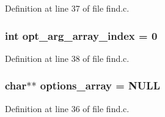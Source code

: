 Definition at line 37 of file find.c.

\subsubsection[{opt\_\-arg\_\-array\_\-index}]{\setlength{\rightskip}{0pt plus 5cm}int {\bf opt\_\-arg\_\-array\_\-index} = 0}\label{find_8c_a29ff3aa134fd092a6be4a6efc20a5e0e}


Definition at line 38 of file find.c.

\subsubsection[{options\_\-array}]{\setlength{\rightskip}{0pt plus 5cm}char$\ast$$\ast$ {\bf options\_\-array} = NULL}\label{find_8c_a64571c81aa84709fbc4f144d39940ad5}


Definition at line 36 of file find.c.


